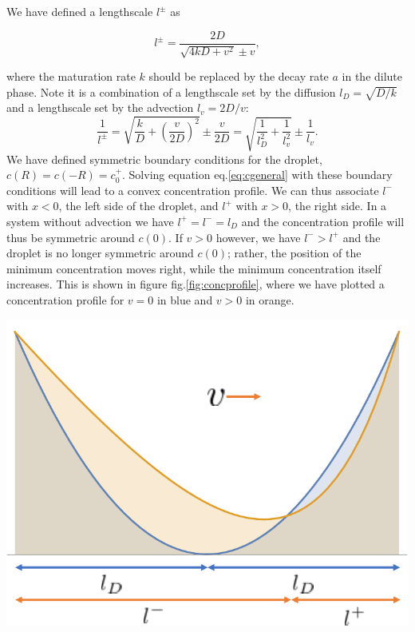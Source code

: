 \documentclass{Dissertate}
\let\origfigure\figure
\let\endorigfigure\endfigure
\renewenvironment{figure}[1][2] {
    \expandafter\origfigure\expandafter[H]
} {
    \endorigfigure
}
\begin{document}
We have defined a lengthscale \(l^\pm\) as

\begin{equation}
l^\pm= \frac{2D}{\sqrt{4kD+v^2}\pm v },
\label{eq:lengthscale}\end{equation}

where the maturation rate \(k\) should be replaced by the decay rate
\(a\) in the dilute phase. Note it is a combination of a lengthscale set
by the diffusion \(l_D=\sqrt{D/k}\) and a lengthscale set by the
advection \(l_v=2D/v\): \[
\frac{1}{l^{\pm}} = \sqrt{\frac{k}{D}+\left(\frac{v}{2D}\right)^2}\pm\frac{v}{2D}=\sqrt{\frac{1}{l_D^2}+\frac{1}{l_v^2}}\pm\frac{1}{l_{v}}.
\] We have defined symmetric boundary conditions for the droplet,
\(c(R)=c(-R)=c_0^+\). Solving equation eq.\ref{eq:cgeneral} with these
boundary conditions will lead to a convex concentration profile. We can
thus associate \(l^-\) with \(x<0\), the left side of the droplet, and
\(l^+\) with \(x>0\), the right side. In a system without advection we
have \(l^+=l^-=l_D\) and the concentration profile will thus be
symmetric around \(c(0)\). If \(v>0\) however, we have \(l^- >l^+\) and
the droplet is no longer symmetric around \(c(0)\); rather, the position
of the minimum concentration moves right, while the minimum
concentration itself increases. This is shown in figure
fig.\ref{fig:concprofile}, where we have plotted a concentration
profile for \(v=0\) in blue and \(v>0\) in orange.

\begin{figure}
\hypertarget{fig:concprofile}{%
\centering
\includegraphics{source/figures/pdf/concprofile.pdf}
\caption{Concentration profiles inside an active droplet for v=0 (blue)
and v\textgreater{}0 (orange). Note that the minimum concentration
increases and that its location moves right.}\label{fig:concprofile}
}
\end{figure}
\end{document}
